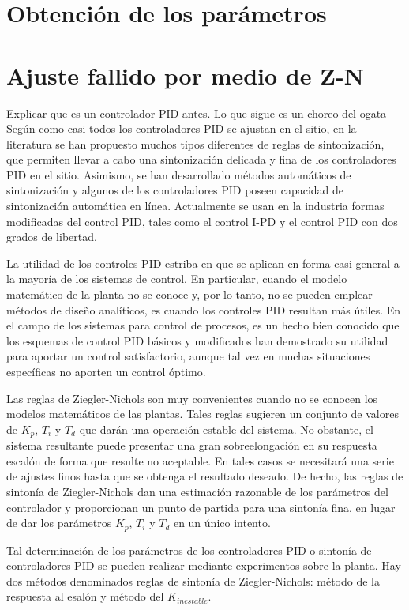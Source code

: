 \documentclass[10pt,conference,a4paper,onecolumn]{article}%
\begin{document}
\section{Obtención de los parámetros}

\section{Ajuste fallido por medio de Z-N}
Explicar que es un controlador PID antes. Lo que sigue es un choreo del ogata\\

Según \cite{ogata} como casi todos los controladores PID se ajustan en el sitio, en la literatura se han propuesto muchos tipos diferentes de reglas de sintonización, que permiten llevar a cabo una sintonización delicada y fina de los controladores PID en el sitio. Asimismo, se han desarrollado métodos automáticos de sintonización y algunos de los controladores PID poseen capacidad de sintonización automática en línea. Actualmente se usan en la industria formas modificadas del control PID, tales como el control I-PD y el control PID con dos grados de libertad.

La utilidad de los controles PID estriba en que se aplican en forma casi general a la mayoría de los sistemas de control. En particular, cuando el modelo matemático de la planta no se conoce y, por lo tanto, no se pueden emplear métodos de diseño analíticos, es cuando los controles PID resultan más útiles. En el campo de los sistemas para control de procesos, es un hecho bien conocido que los esquemas de control PID básicos y modificados han demostrado su utilidad para aportar un control satisfactorio, aunque tal vez en muchas situaciones específicas no aporten un control óptimo.

Las reglas de Ziegler-Nichols son muy convenientes cuando no se conocen los modelos matemáticos de las plantas. Tales reglas sugieren un conjunto de valores de $K_p$, $T_i$ y $T_d$ que darán una operación estable del sistema. No obstante, el sistema resultante puede presentar una gran sobreelongación en su respuesta escalón de forma que resulte no aceptable. En tales casos se necesitará una serie de ajustes finos hasta que se obtenga el resultado deseado. De hecho, las reglas de sintonía de Ziegler-Nichols dan una estimación razonable de los parámetros del controlador y proporcionan un punto de partida para una sintonía fina, en lugar de dar los parámetros $K_p$, $T_i$ y $T_d$ en un único intento.

Tal determinación de los parámetros de los controladores PID o sintonía de controladores PID se pueden realizar mediante experimentos sobre la planta. Hay dos métodos denominados reglas de sintonía de Ziegler-Nichols: método de la respuesta al esalón y método del $K_{inestable}$.  
\end{document}

